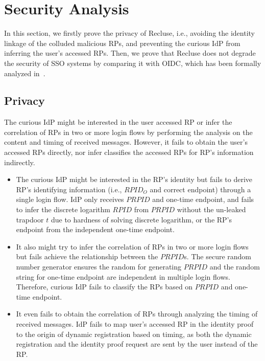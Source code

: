 \section{Security Analysis}
\label{sec:analysis}
In this section, we firstly prove the privacy of Recluse, i.e., avoiding the identity linkage of the colluded malicious RPs, and preventing the curious IdP from inferring the user's accessed RPs.
Then, we prove that Recluse does not degrade the security of SSO systems by comparing it with OIDC, which has been formally analyzed in~\cite{FettKS17}.


\subsection{Privacy}
\label{subsec:privacy}
 The curious IdP might be interested in the user accessed RP or infer the correlation of RPs in two or more login flows by performing the analysis on the content and timing of received messages. However, it fails to obtain the user's accessed RPs directly, nor infer classifies the accessed RPs for RP's information indirectly.
\begin{itemize}
  \item The curious IdP might be interested in the RP's identity but fails to derive RP's identifying information (i.e., $RPID_O$ and correct endpoint) through a single login flow. IdP only receives $PRPID$ and one-time endpoint, and fails to infer the discrete logarithm $RPID$ from $PRPID$ without the un-leaked trapdoor $t$  due to hardness of solving discrete logarithm, or the RP's endpoint from the independent one-time endpoint.
  \item It also might try to infer the correlation of RPs in two or more login flows but fails achieve the relationship between the $PRPID$s. The secure random number generator ensures the random for generating $PRPID$ and the random string for one-time endpoint are independent in multiple login flows. Therefore, curious IdP fails to classify the RPs based on $PRPID$ and one-time endpoint.
  \item It even fails to obtain the correlation of RPs through analyzing the timing of received messages. IdP fails to map user's accessed RP in the identity proof to the origin of dynamic registration based on timing, as both the dynamic registration and the identity proof request are sent by the user instead of the RP.
\end{itemize}

